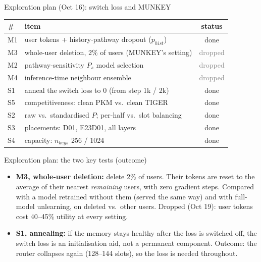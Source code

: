 \documentclass{beamer}
\newcommand{\stdone}{\textcolor{green!50!black}{done}}
\newcommand{\stdrop}{\textcolor{gray}{dropped}}
\begin{document}
\begin{frame}{Exploration plan (Oct 16): switch loss and MUNKEY}
\begin{center}
\small
\begin{tabular}{|l|l|c|}
\hline
\# & item & status \\
\hline
M1 & user tokens + history-pathway dropout ($p_{hist}$) & \stdone \\
M3 & whole-user deletion, 2\% of users (MUNKEY's setting) & \stdrop \\
M2 & pathway-sensitivity $P_s$ model selection & \stdrop \\
M4 & inference-time neighbour ensemble & \stdrop \\
S1 & anneal the switch loss to 0 (from step 1k / 2k) & \stdone \\
S5 & competitiveness: clean PKM vs.\ clean TIGER & \stdone \\
S2 & raw vs.\ standardised $P$; per-half vs.\ slot balancing & \stdone \\
S3 & placements: D01, E23D01, all layers & \stdone \\
S4 & capacity: $n_{keys}$ 256 / 1024 & \stdone \\
\hline
\end{tabular}
\end{center}
\end{frame}

\begin{frame}{Exploration plan: the two key tests (outcome)}
\begin{itemize}
  \item \textbf{M3, whole-user deletion:} delete 2\% of users. Their tokens are
        reset to the average of their nearest \emph{remaining} users, with zero
        gradient steps. Compared with a model retrained without them (served the
        same way) and with full-model unlearning, on deleted vs.\ other users.
        \alert{Dropped (Oct 19): user tokens cost 40--45\% utility at every setting.}
  \item \textbf{S1, annealing:} if the memory stays healthy after the loss is
        switched off, the switch loss is an initialisation aid, not a permanent
        component. \alert{Outcome: the router collapses again (128--144 slots), so
        the loss is needed throughout.}
\end{itemize}
\end{frame}
\end{document}
